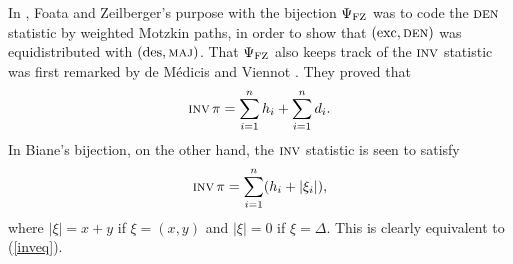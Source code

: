 

In \cite{FZ}, Foata and Zeilberger's purpose with the bijection $\Psi_{\rm FZ}$
was to code the $\mathop{\mbox{\sc den}}\nolimits$ statistic by weighted Motzkin paths, in order to
show that
$(\mathop{\rm exc},\mathop{\mbox{\sc den}}\nolimits)$ was equidistributed with $(\mathop{\rm des},\mathop{\mbox{\sc maj}}\nolimits)$. That $\Psi_{\rm FZ}$ also
keeps track of the $\mathop{\mbox{\sc inv}}\nolimits$ statistic was first remarked by de M\'edicis and
Viennot \cite[Proposition 5.2]{medvie}. They proved that
\begin{eqnarray}
\mathop{\mbox{\sc inv}}\nolimits\pi=\sum_{i=1}^nh_i+\sum_{i=1}^nd_i. \label{inveq}
\end{eqnarray}
In Biane's bijection, on the other hand, the $\mathop{\mbox{\sc inv}}\nolimits$ statistic is seen
to satisfy
%
$$
\mathop{\mbox{\sc inv}}\nolimits\mbox{$\pi$}=\sum_{i=1}^n(h_i+|\xi_i|),
$$
%
where $|\xi|=x+y$ if $\xi=(x,y)$ and $|\xi|=0$ if $\xi=\Delta$. This
is clearly equivalent to (\ref{inveq}).

